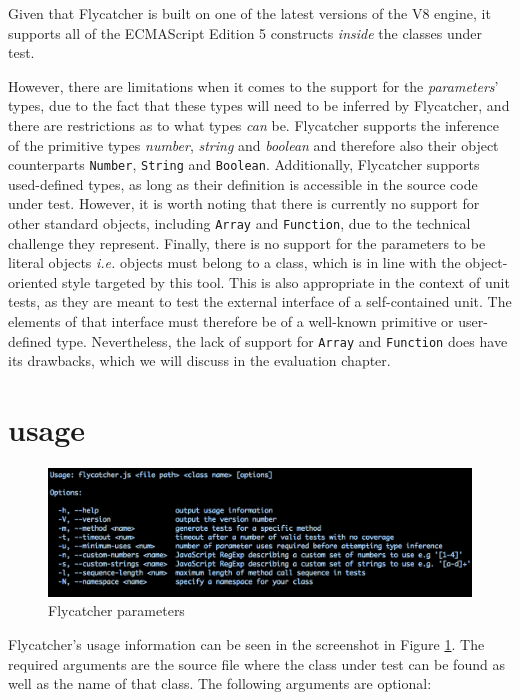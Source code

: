 Given that \textsf{Flycatcher} is built on one of the latest versions of the V8 engine, it supports all of the ECMAScript Edition 5 constructs \emph{inside} the classes under test.

However, there are limitations when it comes to the support for the \emph{parameters}' types, due to the fact that these types will need to be inferred by \textsf{Flycatcher}, and there are restrictions as to what types \emph{can} be. Flycatcher supports the inference of the primitive types \emph{number}, \emph{string} and \emph{boolean} and therefore also their object counterparts \texttt{Number}, \texttt{String} and \texttt{Boolean}. Additionally, \textsf{Flycatcher} supports used-defined types, as long as their definition is accessible in the source code under test. However, it is worth noting that there is currently no support for other standard objects, including \texttt{Array} and \texttt{Function}, due to the technical challenge they represent. Finally, there is no support for the parameters to be literal objects \emph{i.e.} objects must belong to a class, which is in line with the object-oriented style targeted by this tool. This is also appropriate in the context of unit tests, as they are meant to test the external interface of a self-contained unit. The elements of that interface must therefore be of a well-known primitive or user-defined type. Nevertheless, the lack of support for \texttt{Array} and \texttt{Function} does have its drawbacks, which we will discuss in the evaluation chapter.

\section{\textsf{} usage}
\begin{figure}[h]
\hspace*{-2cm}
\centering
\includegraphics[scale=0.45]{./components/chapter7/params.png}
\caption{\textsf{Flycatcher} parameters}
\label{usage}
\end{figure}

\textsf{Flycatcher}'s usage information can be seen in the screenshot in Figure \ref{usage}. The required arguments are the source file where the class under test can be found as well as the name of that class. The following arguments are optional:

